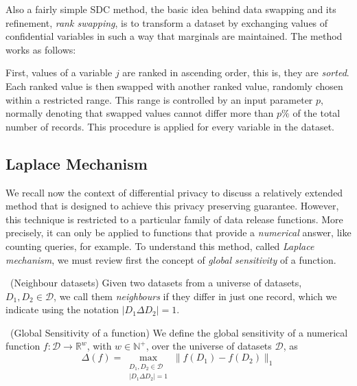 Also a fairly simple SDC method, the basic idea behind data swapping and its refinement, \textit{rank swapping}, is to transform a dataset by exchanging values of confidential variables in such a way that marginals are maintained. The method works as follows:

First, values of a variable $j$ are ranked in ascending order, this is, they are \textit{sorted}. Each ranked value is then swapped with another ranked value, randomly chosen within a restricted range. This range is controlled by an input parameter $p$, normally denoting that swapped values cannot differ more than $p\%$ of the total number of records. This procedure is applied for every variable in the dataset.

\subsection{Laplace Mechanism}
\label{Theory:SDCMethods:LaplaceMechanism}

We recall now the context of differential privacy to discuss a relatively extended method that is designed to achieve this privacy preserving guarantee. However, this technique is restricted to a particular family of data release functions. More precisely, it can only be applied to functions that provide a \textit{numerical} answer, like counting queries, for example. To understand this method, called \textit{Laplace mechanism}, we must review first the concept of \textit{global sensitivity} of a function.

\begin{definition}~(Neighbour datasets)
Given two datasets from a universe of datasets, $D_1, D_2 \in \mathcal{D}$, we call them \textit{neighbours} if they differ in just one record, which we indicate using the notation $|D_1 \Delta D_2| = 1$.
\end{definition}

\begin{definition}~(Global Sensitivity of a function)
We define the global sensitivity of a numerical function $f : \mathcal{D} \rightarrow \mathbb{R}^w$, with $w \in \mathbb{N}^+$, over the universe of datasets $\mathcal{D}$, as
\begin{equation}
\Delta(f) = \max_{\substack{D_1, D_2 \in \mathcal{D} \\ |D_1 \Delta D_2| = 1}} \lVert f(D_1) - f(D_2) \rVert_{1}
\end{equation}
\end{definition}

